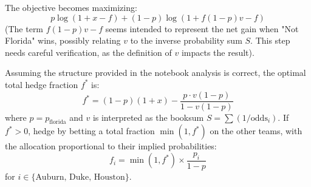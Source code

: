 \documentclass{article}
\begin{document}
The objective becomes maximizing:
\[ p \log(1+x-f)+(1-p)\log(1+f(1-p)v-f) \]
(The term $f(1-p)v - f$ seems intended to represent the net gain when "Not Florida" wins, possibly relating $v$ to the inverse probability sum $S$. This step needs careful verification, as the definition of $v$ impacts the result).

Assuming the structure provided in the notebook analysis is correct, the optimal total hedge fraction $f^*$ is:
\begin{equation} \label{eq:closed_form}
f^* = (1-p)(1+x) - \frac{p \cdot v(1-p)}{1-v(1-p)} 
\end{equation}
where $p = p_{\text{florida}}$ and $v$ is interpreted as the booksum $S = \sum (1/\text{odds}_i)$. If $f^* > 0$, hedge by betting a total fraction $\min(1, f^*)$ on the other teams, with the allocation proportional to their implied probabilities:
\[ f_i = \min(1, f^*) \times \frac{p_i}{1-p} \]
for $i \in \{\text{Auburn, Duke, Houston}\}$.
\end{document}
